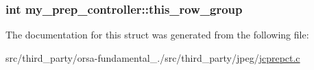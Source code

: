 \subsubsection[{this\+\_\+row\+\_\+group}]{\setlength{\rightskip}{0pt plus 5cm}int my\+\_\+prep\+\_\+controller\+::this\+\_\+row\+\_\+group}\label{structmy__prep__controller_a2fd911bc5ad6043822b493554513b8bb}


The documentation for this struct was generated from the following file\+:\begin{DoxyCompactItemize}
\item 
src/third\+\_\+party/orsa-\/fundamental\+\_./src/third\+\_\+party/jpeg/\hyperlink{jcprepct_8c}{jcprepct.\+c}\end{DoxyCompactItemize}
